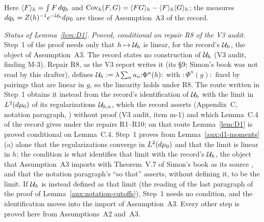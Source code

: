 Here $\langle F\rangle_{h}=\int F\,dq_h$ and $\operatorname{Cov}_h(F,G)=\langle FG\rangle_{h}-\langle F\rangle_{h}\langle G\rangle_{h}$; the measures
$dq_h=Z(h)^{-1}e^{-\mathcal U_h}d\mu_0$ are those of Assumption~A3 of the record.

\emph{Status of Lemma~\ref{lem:D1}.} \emph{Proved, conditional on repair R8 of the V3 audit.}
Step~1 of the proof needs only that $h\mapsto\mathcal U_h$ is linear, for the record's $\mathcal U_h$, the
object of Assumption~A3.  The record states no construction of $\mathcal U_h$ (V3 audit, finding M-3).
Repair R8, as the V3 report writes it (its \S9; Simon's book was not read by this drafter),
defines $\mathcal U_h:=\lambda\sum_na_n{:}\Phi^n(h){:}$ with ${:}\Phi^n(g){:}$ fixed by pairings that
are linear in $g$, so the linearity holds under R8.  The route written in Step~1 obtains it
instead from the record's identification of $\mathcal U_h$ with the limit in $L^2(d\mu_0)$ of its
regularizations $\mathcal U_{h,\kappa}$, which the record asserts (Appendix~C, notation paragraph,
\cite[p.~39]{R}) without proof (V3 audit, item m-1) and which Lemma~C.4 of the record
\cite[p.~40]{R} gives under the repairs R1--R10; on that route Lemma~\ref{lem:D1} is proved
conditional on Lemma~C.4.  Step~1 proves from Lemma~\ref{aux:d1-moments}(a) alone that the
regularizations converge in $L^2(d\mu_0)$ and that the limit is linear in $h$; the condition is
what identifies that limit with the record's $\mathcal U_h$, the object that Assumption~A3 imports with
Theorem~V.7 of Simon's book as its source \cite[p.~8]{R}, and that the notation paragraph's
``so that'' asserts, without defining it, to be the limit.  If $\mathcal U_h$ is instead defined as
that limit (the reading of the last paragraph of the proof of
Lemma~\ref{aux:notation-cutoffs}), Step~1 needs no condition, and the identification moves into
the import of Assumption~A3.  Every other step is proved here from Assumptions~A2 and~A3.

